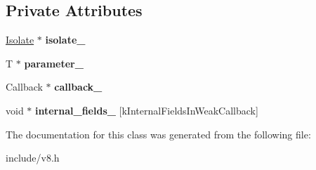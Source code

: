 \subsection*{Private Attributes}
\begin{DoxyCompactItemize}
\item 
\hyperlink{classv8_1_1_isolate}{Isolate} $\ast$ {\bfseries isolate\+\_\+}\hypertarget{classv8_1_1_weak_callback_info_ae50449492b57da9cd055f5f69c7ca336}{}\label{classv8_1_1_weak_callback_info_ae50449492b57da9cd055f5f69c7ca336}

\item 
T $\ast$ {\bfseries parameter\+\_\+}\hypertarget{classv8_1_1_weak_callback_info_a98c635b4de81a662986fac486407e895}{}\label{classv8_1_1_weak_callback_info_a98c635b4de81a662986fac486407e895}

\item 
Callback $\ast$ {\bfseries callback\+\_\+}\hypertarget{classv8_1_1_weak_callback_info_a68460dc23ab6c64334090665d1ddf366}{}\label{classv8_1_1_weak_callback_info_a68460dc23ab6c64334090665d1ddf366}

\item 
void $\ast$ {\bfseries internal\+\_\+fields\+\_\+} \mbox{[}k\+Internal\+Fields\+In\+Weak\+Callback\mbox{]}\hypertarget{classv8_1_1_weak_callback_info_a9f4de09bcd496ba8109eec7774395a8b}{}\label{classv8_1_1_weak_callback_info_a9f4de09bcd496ba8109eec7774395a8b}

\end{DoxyCompactItemize}


The documentation for this class was generated from the following file\+:\begin{DoxyCompactItemize}
\item 
include/v8.\+h\end{DoxyCompactItemize}
